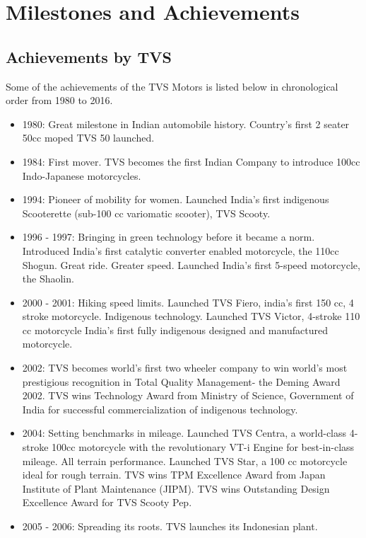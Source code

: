 \section{Milestones and Achievements}

\subsection{Achievements by TVS}

Some of the achievements of the TVS Motors is listed below in chronological order from 1980 to 2016. \cite{tvsmotorMotorCompanyAcheivements}  

\begin{itemize}
	\item 1980: Great milestone in Indian automobile history. Country's first 2 seater 50cc moped TVS 50 launched.
	\item 1984: First mover. TVS becomes the first Indian Company to introduce 100cc Indo-Japanese motorcycles.
	\item 1994:	Pioneer of mobility for women. Launched India's first indigenous Scooterette (sub-100 cc variomatic scooter), TVS Scooty.
	\item 1996 - 1997: Bringing in green technology before it became a norm. Introduced India's first catalytic converter enabled motorcycle, the 110cc Shogun. Great ride. Greater speed. Launched India's first 5-speed motorcycle, the Shaolin.
	\item 2000 - 2001: Hiking speed limits. Launched TVS Fiero, india's first 150 cc, 4 stroke motorcycle. Indigenous technology. Launched TVS Victor, 4-stroke 110 cc motorcycle India's first fully indigenous designed and manufactured motorcycle.
	\item 2002:	TVS becomes world's first two wheeler company to win world's most prestigious recognition in Total Quality Management- the Deming Award 2002. TVS wins Technology Award from Ministry of Science, Government of India for successful commercialization of indigenous technology.
	\item 2004:	Setting benchmarks in mileage. Launched TVS Centra, a world-class 4-stroke 100cc motorcycle with the revolutionary VT-i Engine for best-in-class mileage.
	All terrain performance. Launched TVS Star, a 100 cc motorcycle ideal for rough terrain.
	TVS wins TPM Excellence Award from Japan Institute of Plant Maintenance (JIPM).
	TVS wins Outstanding Design Excellence Award for TVS Scooty Pep.
	\item 2005 - 2006: Spreading its roots. TVS launches its Indonesian plant.

\end{itemize}
